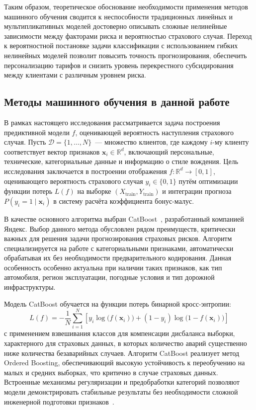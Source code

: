 Таким образом, теоретическое обоснование необходимости применения методов машинного обучения сводится к неспособности традиционных линейных и мультипликативных моделей достоверно описывать сложные нелинейные зависимости между факторами риска и вероятностью страхового случая. Переход к вероятностной постановке задачи классификации с использованием гибких нелинейных моделей позволит повысить точность прогнозирования, обеспечить персонализацию тарифов и снизить уровень перекрестного субсидирования между клиентами с различным уровнем риска.

\subsection{Методы машинного обучения в данной работе}

В рамках настоящего исследования рассматривается задача построения предиктивной модели $f$, оценивающей вероятность наступления страхового случая. Пусть $\mathcal{D} = \{1, \ldots, N\}$~--- множество клиентов, где каждому $i$-му клиенту соответствует вектор признаков $\mathbf{x}_i \in \mathbb{R}^d$, включающий персональные, технические, категориальные данные и информацию о стиле вождения. Цель исследования заключается в построении отображения $f \colon \mathbb{R}^d \rightarrow [0, 1]$, оценивающего вероятность страхового случая $y_i \in \{0, 1\}$ путём оптимизации функции потерь $L(f)$ на выборке $(X_{\text{train}}, Y_{\text{train}})$ и интеграции прогноза $P(y_i = 1 \mid \mathbf{x}_i)$ в систему расчёта коэффициента бонус-малус.

В качестве основного алгоритма выбран CatBoost~\cite{prokhorenkova2018catboost}, разработанный компанией Яндекс. Выбор данного метода обусловлен рядом преимуществ, критически важных для решения задачи прогнозирования страховых рисков. Алгоритм специализируется на работе с категориальными признаками, автоматически обрабатывая их без необходимости предварительного кодирования. Данная особенность особенно актуальна при наличии таких признаков, как тип автомобиля, регион эксплуатации, погодные условия и тип дорожной инфраструктуры.

Модель CatBoost обучается на функции потерь бинарной кросс-энтропии:
\[
L(f) = -\frac{1}{N} \sum_{i=1}^{N} \left[ y_i \log\bigl(f(\mathbf{x}_i)\bigr) + (1 - y_i) \log\bigl(1 - f(\mathbf{x}_i)\bigr) \right]
\]
с применением взвешивания классов для компенсации дисбаланса выборки, характерного для страховых данных, в которых количество аварий существенно ниже количества безаварийных случаев. Алгоритм CatBoost реализует метод Ordered Boosting, обеспечивающий высокую устойчивость к переобучению на малых и средних выборках, что критично в случае страховых данных. Встроенные механизмы регуляризации и предобработки категорий позволяют модели демонстрировать стабильные результаты без необходимости сложной инженерной подготовки признаков~\cite{catboost2026docs}.


